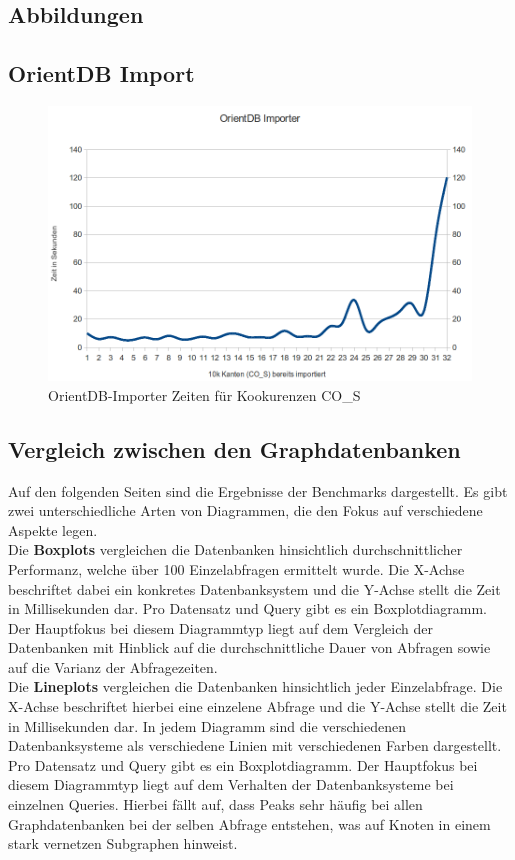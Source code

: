 \documentclass[11pt, a4paper, oneside]{article} %
\begin{document}
\newpage

\begin{appendix}
\section{Abbildungen}
\subsection{OrientDB Import}
\label{anh:orientimport}

\begin{figure}[ht] 
	\centering
		\includegraphics[scale=.3]{OrientImporter.png}
	\caption{OrientDB-Importer Zeiten für Kookurenzen CO\_{}S}
	\label{fig:orientdb_import}
\end{figure}

\subsection{Vergleich zwischen den Graphdatenbanken}
Auf den folgenden Seiten sind die Ergebnisse der Benchmarks dargestellt. Es gibt zwei unterschiedliche Arten von Diagrammen, die den Fokus auf verschiedene Aspekte legen. \\
Die \textbf{Boxplots} vergleichen die Datenbanken hinsichtlich durchschnittlicher Performanz, welche über 100 Einzelabfragen ermittelt wurde. Die X-Achse beschriftet dabei ein konkretes Datenbanksystem und die Y-Achse stellt die Zeit in Millisekunden dar. Pro Datensatz und Query gibt es ein Boxplotdiagramm. Der Hauptfokus bei diesem Diagrammtyp liegt auf dem Vergleich der Datenbanken mit Hinblick auf die durchschnittliche Dauer von Abfragen sowie auf die Varianz der Abfragezeiten.\\
Die \textbf{Lineplots} vergleichen die Datenbanken hinsichtlich jeder Einzelabfrage. Die X-Achse beschriftet hierbei eine einzelene Abfrage und die Y-Achse stellt die Zeit in Millisekunden dar. In jedem Diagramm sind die verschiedenen Datenbanksysteme als verschiedene Linien mit verschiedenen Farben dargestellt. Pro Datensatz und Query gibt es ein Boxplotdiagramm. Der Hauptfokus bei diesem Diagrammtyp liegt auf dem Verhalten der Datenbanksysteme bei einzelnen Queries. Hierbei fällt auf, dass Peaks sehr häufig bei allen Graphdatenbanken bei der selben Abfrage entstehen, was auf Knoten in einem stark vernetzen Subgraphen hinweist.


\end{appendix}
\end{document}
